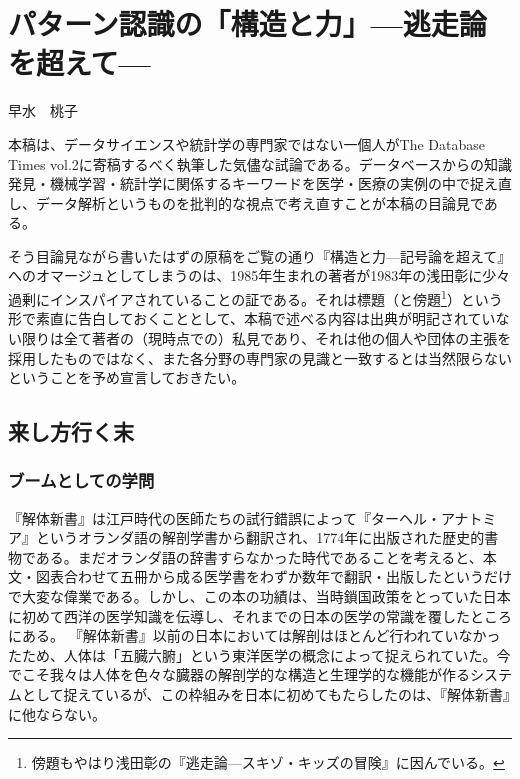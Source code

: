 
\chapter{パターン認識の「構造と力」\Large{---逃走論を超えて---}}

\begin{flushright}
 早水　桃子 %
\end{flushright}

\begin{spacing}{0.6}
\noindent
{\footnotesize{本稿は、データサイエンスや統計学の専門家ではない一個人がThe Database Times vol.2に寄稿するべく執筆した気儘な試論である。データベースからの知識発見・機械学習・統計学に関係するキーワードを医学・医療の実例の中で捉え直し、データ解析というものを批判的な視点で考え直すことが本稿の目論見である。

\noindent
そう目論見ながら書いたはずの原稿をご覧の通り『構造と力---記号論を超えて』へのオマージュとしてしまうのは、1985年生まれの著者が1983年の浅田彰に少々過剰にインスパイアされていることの証である。それは標題（と傍題\footnote{傍題もやはり浅田彰の『逃走論---スキゾ・キッズの冒険』に因んでいる。}）という形で素直に告白しておくこととして、本稿で述べる内容は出典が明記されていない限りは全て著者の（現時点での）私見であり、それは他の個人や団体の主張を採用したものではなく、また各分野の専門家の見識と一致するとは当然限らないということを予め宣言しておきたい。}}
\end{spacing}
 
\section{来し方行く末}
\subsection{ブームとしての学問}
『解体新書』は江戸時代の医師たちの試行錯誤によって『ターヘル・アナトミア』というオランダ語の解剖学書から翻訳され、1774年に出版された歴史的書物である。まだオランダ語の辞書すらなかった時代であることを考えると、本文・図表合わせて五冊から成る医学書をわずか数年で翻訳・出版したというだけで大変な偉業である。しかし、この本の功績は、当時鎖国政策をとっていた日本に初めて西洋の医学知識を伝導し、それまでの日本の医学の常識を覆したところにある。
『解体新書』以前の日本においては解剖はほとんど行われていなかったため、人体は「五臓六腑」という東洋医学の概念によって捉えられていた。今でこそ我々は人体を色々な臓器の解剖学的な構造と生理学的な機能が作るシステムとして捉えているが、この枠組みを日本に初めてもたらしたのは、『解体新書』に他ならない。

